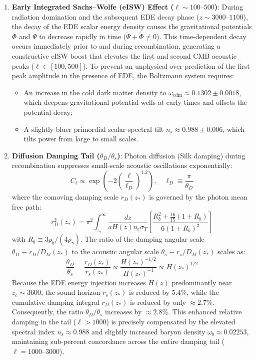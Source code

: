 \documentclass[11pt,a4paper]{article}
\theoremstyle{definition}
\begin{document}
\begin{enumerate}
    \item \textbf{Early Integrated Sachs--Wolfe (eISW) Effect ($\ell \sim 100\text{--}500$)}:
    During radiation domination and the subsequent EDE decay phase ($z \sim 3000\text{--}1100$), the decay of the EDE scalar energy density causes the gravitational potentials $\Phi$ and $\Psi$ to decrease rapidly in time ($\dot{\Psi} + \dot{\Phi} \neq 0$). This time-dependent decay occurs immediately prior to and during recombination, generating a constructive eISW boost that elevates the first and second CMB acoustic peaks ($\ell \in [100, 500]$).
    To prevent an unphysical over-prediction of the first peak amplitude in the presence of EDE, the Boltzmann system requires:
    \begin{itemize}
        \item An increase in the cold dark matter density to $\omega_{\mathrm{cdm}} \approx 0.1302 \pm 0.0018$, which deepens gravitational potential wells at early times and offsets the potential decay;
        \item A slightly bluer primordial scalar spectral tilt $n_s \approx 0.988 \pm 0.006$, which tilts power from large to small scales.
    \end{itemize}

    \item \textbf{Diffusion Damping Tail ($\theta_D / \theta_s$)}:
    Photon diffusion (Silk damping) during recombination suppresses small-scale acoustic oscillations exponentially:
    \begin{equation}
    C_\ell \propto \exp\left( - 2 \left(\frac{\ell}{\ell_D}\right)^{1.2} \right), \quad \ell_D \equiv \frac{\pi}{\theta_D}
    \end{equation}
    where the comoving damping scale $r_D(z_*)$ is governed by the photon mean free path:
    \begin{equation}
    r_D^2(z_*) = \pi^2 \int_{z_*}^\infty \frac{dz}{a H(z) n_e \sigma_T} \left[ \frac{R_b^2 + \frac{16}{15}(1+R_b)}{6(1+R_b)^2} \right]
    \end{equation}
    with $R_b \equiv 3\rho_b / (4\rho_\gamma)$. The ratio of the damping angular scale $\theta_D \equiv r_D / D_M(z_*)$ to the acoustic angular scale $\theta_s \equiv r_s / D_M(z_*)$ scales as:
    \begin{equation}
    \frac{\theta_D}{\theta_s} = \frac{r_D(z_*)}{r_s(z_*)} \propto \frac{H(z_*)^{-1/2}}{H(z_*)^{-1}} \propto H(z_*)^{1/2}
    \end{equation}
    Because the EDE energy injection increases $H(z)$ predominantly near $z_c \sim 3600$, the sound horizon $r_s(z_*)$ is reduced by $5.4\%$, while the cumulative damping integral $r_D(z_*)$ is reduced by only $\approx 2.7\%$. Consequently, the ratio $\theta_D / \theta_s$ increases by $\approx 2.8\%$. This enhanced relative damping in the tail ($\ell > 1000$) is precisely compensated by the elevated spectral index $n_s \approx 0.988$ and slightly increased baryon density $\omega_b \approx 0.02253$, maintaining sub-percent concordance across the entire damping tail ($\ell = 1000\text{--}3000$).
\end{enumerate}
\end{document}

